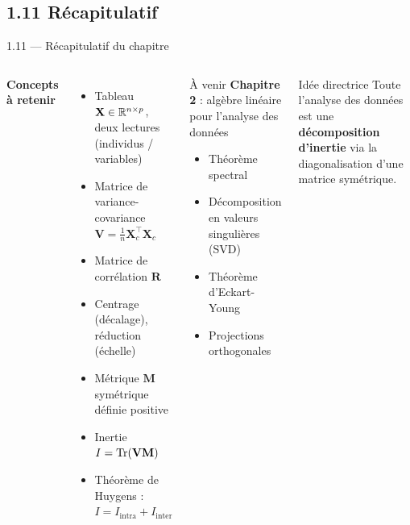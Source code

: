 \subsection{1.11 Récapitulatif}
\begin{frame}{1.11 — Récapitulatif du chapitre}
\begin{columns}[T]
\textbf{Concepts à retenir}
\begin{itemize}\small
  \item Tableau $\mathbf{X} \in \mathbb{R}^{n\times p}$, deux lectures
        (individus / variables)
  \item Matrice de variance-covariance
        $\mathbf{V} = \frac{1}{n}\mathbf{X}_c^\top \mathbf{X}_c$
  \item Matrice de corrélation $\mathbf{R}$
  \item Centrage (décalage), réduction (échelle)
  \item Métrique $\mathbf{M}$ symétrique définie positive
  \item Inertie $I = \operatorname{Tr}(\mathbf{V}\mathbf{M})$
  \item Théorème de Huygens : $I = I_{\text{intra}} + I_{\text{inter}}$
\end{itemize}

\begin{block}{À venir}
\textbf{Chapitre 2} : algèbre linéaire pour l'analyse des données
\begin{itemize}\small
  \item Théorème spectral
  \item Décomposition en valeurs singulières (SVD)
  \item Théorème d'Eckart-Young
  \item Projections orthogonales
\end{itemize}
\end{block}

\begin{alertblock}{Idée directrice}
Toute l'analyse des données est une
\textbf{décomposition d'inertie} via la diagonalisation
d'une matrice symétrique.
\end{alertblock}
\end{columns}
\end{frame}
